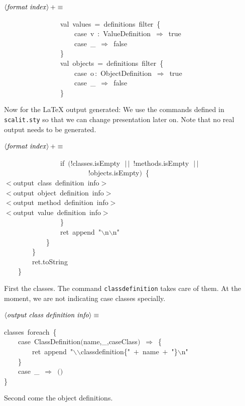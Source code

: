 \documentclass[a4paper,12pt]{article}
\begin{document}
$\left<\mbox{\emph{format index}}\right>+\equiv$
\begin{program}~~~~~~~~~~~~~~~~{\vem val}~values~=~definitions~filter~{\small\{}
\\~~~~~~~~~~~~~~~~~~~~{\vem case}~v~{\rm :}~ValueDefinition~$\Rightarrow$~{\vem true}
\\~~~~~~~~~~~~~~~~~~~~{\vem case}~\_~$\Rightarrow$~{\vem false}
\\~~~~~~~~~~~~~~~~{\small\}}
\\~~~~~~~~~~~~~~~~{\vem val}~objects~=~definitions~filter~{\small\{}
\\~~~~~~~~~~~~~~~~~~~~{\vem case}~o\,{\rm :}~ObjectDefinition~$\Rightarrow$~{\vem true}
\\~~~~~~~~~~~~~~~~~~~~{\vem case}~\_~$\Rightarrow$~{\vem false}
\\~~~~~~~~~~~~~~~~{\small\}}
\\[0.5em]\end{program}
Now for the LaTeX output generated: We use the commands defined
in \texttt{scalit.sty} so that we can change presentation later on. Note that
no real output needs to be generated.

$\left<\mbox{\emph{format index}}\right>+\equiv$
\begin{program}~~~~~~~~~~~~~~~~{\vem if}~$($!classes.isEmpty~$\,|$$\,|$~!methods.isEmpty~$\,|$$\,|$
\\~~~~~~~~~~~~~~~~~~~~~~~~!objects.isEmpty$)$~{\small\{}
\\$<$output~{\vem class}~definition~info$>$
\\$<$output~{\vem object}~definition~info$>$
\\$<$output~method~definition~info$>$
\\$<$output~value~definition~info$>$
\\~~~~~~~~~~~~~~~~{\small\}}
\\~~~~~~~~~~~~~~~~ret~append~"$\backslash$n$\backslash$n"
\\~~~~~~~~~~~~{\small\}}
\\~~~~~~~~{\small\}}
\\[0.5em]~~~~~~~~ret.toString
\\~~~~{\small\}}
\\[0.5em]\end{program}
First the classes. The command \texttt{classdefinition} takes care
of them. At the moment, we are not indicating case classes specially.

$\left<\mbox{\emph{output class definition info}}\right>\equiv$
\begin{program}classes~foreach~{\small\{}
\\~~~~{\vem case}~ClassDefinition$($name,\_,caseClass$)$~$\Rightarrow$~{\small\{}
\\~~~~~~~~ret~append~"$\backslash$$\backslash$classdefinition{\small\{}"~$+$~name~$+$~"{\small\}}$\backslash$n"
\\~~~~{\small\}}
\\~~~~{\vem case}~\_~$\Rightarrow$~$($$)$
\\{\small\}}
\\[0.5em]\end{program}
Second come the object definitions.
\end{document}

